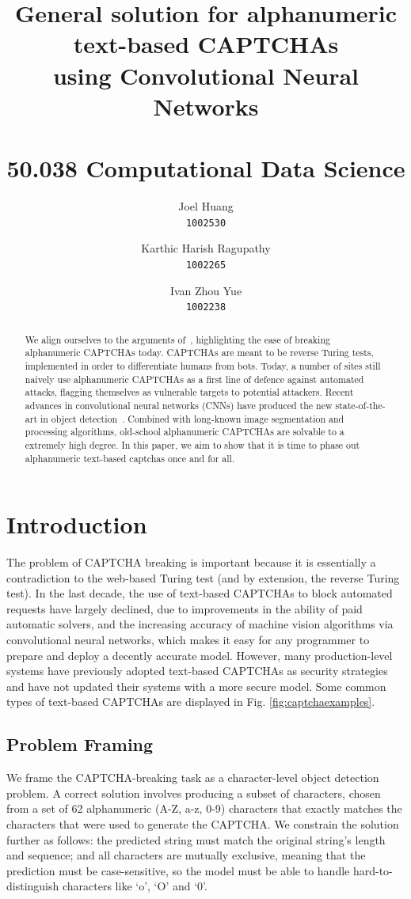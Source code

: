 \documentclass[twocolumn,10pt]{article}
\title{
	General solution for alphanumeric text-based CAPTCHAs\\
  using Convolutional Neural Networks\\ $ $\\
  \large 50.038 Computational Data Science \\
}
\author{
  Joel Huang\\
  \texttt{1002530}
  \and
  Karthic Harish Ragupathy\\
  \texttt{1002265}
  \and
  Ivan Zhou Yue\\
  \texttt{1002238}
}
\begin{document}
\maketitle

\begin{abstract}
We align ourselves to the arguments of~\cite{cc,readingtext,stark2015captcha,zhaocaptcha}, highlighting the ease of breaking alphanumeric CAPTCHAs today. CAPTCHAs are meant to be reverse Turing tests, implemented in order to differentiate humans from bots. Today, a number of sites still naively use alphanumeric CAPTCHAs as a first line of defence against automated attacks, flagging themselves as vulnerable targets to potential attackers. Recent advances in convolutional neural networks (CNNs) have produced the new state-of-the-art in object detection~\cite{resnet,fl}. Combined with long-known image segmentation and processing algorithms, old-school alphanumeric CAPTCHAs are solvable to a extremely high degree. In this paper, we aim to show that it is time to phase out alphanumeric text-based captchas once and for all.
\end{abstract}

\section{Introduction}
The problem of CAPTCHA breaking is important because it is essentially a contradiction to the web-based Turing test (and by extension, the reverse Turing test). In the last decade, the use of text-based CAPTCHAs to block automated requests have largely declined, due to improvements in the ability of paid automatic solvers, and the increasing accuracy of machine vision algorithms via convolutional neural networks, which makes it easy for any programmer to prepare and deploy a decently accurate model. However, many production-level systems have previously adopted text-based CAPTCHAs as security strategies and have not updated their systems with a more secure model.  Some common types of text-based CAPTCHAs are displayed in Fig. \ref{fig:captchaexamples}.

\subsection{Problem Framing}
We frame the CAPTCHA-breaking task as a character-level object detection problem. A correct solution involves producing a subset of characters, chosen from a set of 62 alphanumeric (A-Z, a-z, 0-9) characters that exactly matches the characters that were used to generate the CAPTCHA. We constrain the solution further as follows: the predicted string must match the original string’s length and sequence; and all characters are mutually exclusive, meaning that the prediction must be case-sensitive, so the model must be able to handle hard-to-distinguish characters like ‘o’, ‘O’ and ‘0’.
\end{document}
